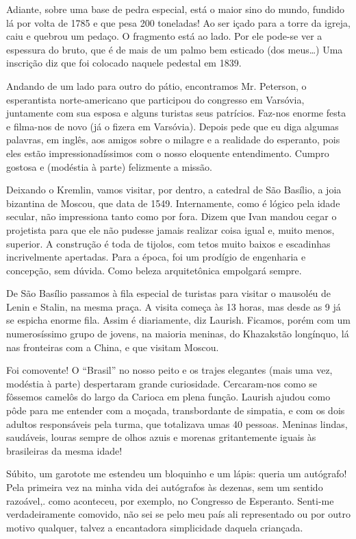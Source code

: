 Adiante, sobre uma base de pedra especial, está o maior sino do mundo, fundido lá por volta de 1785 e que pesa 200 toneladas! Ao ser içado para a torre da igreja, caiu e quebrou um pedaço. O fragmento está ao lado. Por ele pode-se ver a espessura do bruto, que é de mais de um palmo bem esticado (dos meus\ldots) Uma inscrição diz que foi colocado naquele pedestal em 1839.

Andando de um lado para outro do pátio, encontramos Mr. Peterson, o esperantista norte-americano que participou do congresso em Varsóvia, juntamente com sua esposa e alguns turistas seus patrícios. Faz-nos enorme festa e filma-nos de novo (já o fizera em Varsóvia). Depois pede que eu diga algumas palavras, em inglês, aos amigos sobre o milagre e a realidade do esperanto, pois eles estão impressionadíssimos com o nosso eloquente entendimento. Cumpro gostosa e (modéstia à parte) felizmente a missão.

Deixando o Kremlin, vamos visitar, por dentro, a catedral de São Basílio, a joia bizantina de Moscou, que data de 1549. Internamente, como é lógico pela idade secular, não impressiona tanto como por fora. Dizem que Ivan mandou cegar o projetista para que ele não pudesse jamais realizar coisa igual e, muito menos, superior. A construção é toda de tijolos, com tetos muito baixos e escadinhas incrivelmente apertadas. Para a época, foi um prodígio de engenharia e concepção, sem dúvida. Como beleza arquitetônica empolgará sempre.

De São Basílio passamos à fila especial de turistas para visitar o mausoléu de Lenin e Stalin, na mesma praça. A visita começa às 13 horas, mas desde as 9 já se espicha enorme fila. Assim é diariamente, diz Laurish. Ficamos, porém com um numerosíssimo grupo de jovens, na maioria meninas, do Khazakstão longínquo, lá nas fronteiras com a China, e que visitam Moscou.

Foi comovente! O ``Brasil'' no nosso peito e os trajes elegantes (mais uma vez, modéstia à parte) despertaram grande curiosidade. Cercaram-nos como se fôssemos camelôs do largo da Carioca em plena função. Laurish ajudou como pôde para me entender com a moçada, transbordante de simpatia, e com os dois adultos responsáveis pela turma, que totalizava umas 40 pessoas. Meninas lindas, saudáveis, louras sempre de olhos azuis e morenas gritantemente iguais às brasileiras da mesma idade!

Súbito, um garotote me estendeu um bloquinho e um lápis: queria um autógrafo! Pela primeira vez na minha vida dei autógrafos às dezenas, sem um sentido razoável,. como aconteceu, por exemplo, no Congresso de Esperanto. Senti-me verdadeiramente comovido, não sei se pelo meu país ali representado ou por outro motivo qualquer, talvez a encantadora simplicidade daquela criançada.

